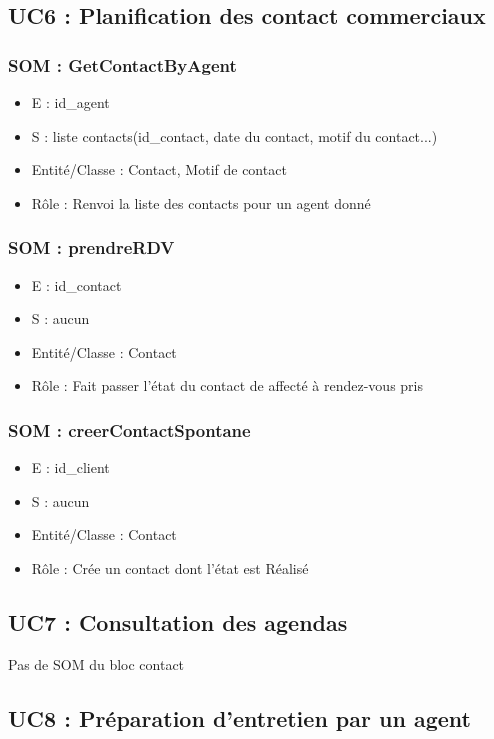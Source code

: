 \subsection{UC6 : Planification des contact commerciaux}
\subsubsection{SOM : GetContactByAgent}
	\begin{itemize}
		\item E : id\_agent
		\item S : liste contacts(id\_contact, date du contact, motif du contact...)
		\item Entité/Classe : Contact, Motif de contact
		\item Rôle : Renvoi la liste des contacts pour un agent donné
	\end{itemize}

\subsubsection{SOM : prendreRDV}
	\begin{itemize}
		\item E : id\_contact
		\item S : aucun
		\item Entité/Classe : Contact
		\item Rôle : Fait passer l’état du contact de affecté à rendez-vous pris
	\end{itemize}

\subsubsection{SOM : creerContactSpontane}
	\begin{itemize}
		\item E : id\_client
		\item S : aucun
		\item Entité/Classe : Contact
		\item Rôle : Crée un contact dont l’état est Réalisé
	\end{itemize}



\subsection{UC7 : Consultation des agendas}
Pas de SOM du bloc contact



\subsection{UC8 : Préparation d’entretien par un agent}
